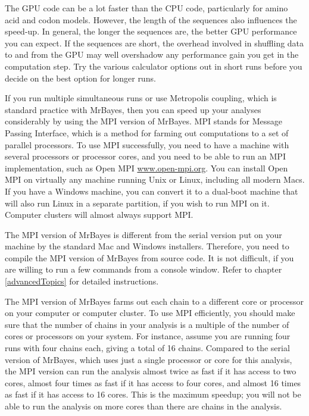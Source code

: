 \documentclass[12pt]{book}
\begin{document}
The GPU code can be a lot faster than the CPU code, particularly for amino acid and codon models.
However, the length of the sequences also influences the speed-up. In general, the longer
the sequences are, the better GPU performance you can expect. If the sequences
are short, the overhead involved in shuffling data to and from the GPU may well overshadow any performance
gain you get in the computation step. Try the various calculator options out in short runs before you decide on
the best option for longer runs.

If you run multiple simultaneous runs or use Metropolis coupling, which is standard practice with MrBayes,
then you can speed up your analyses considerably by using the MPI version of MrBayes. MPI stands for
Message Passing Interface, which is a method for farming out computations to a set of parallel processors.
To use MPI successfully, you need to have a machine with several processors or processor cores, and you
need to be able to run an MPI implementation, such as Open MPI \url{www.open-mpi.org}. You can install
Open MPI on virtually any machine running Unix or Linux, including all modern Macs. If you have a Windows
machine, you can convert it to a dual-boot machine that will also run Linux in a separate partition, if you wish
to run MPI on it. Computer clusters will almost always support MPI.

The MPI version of MrBayes is different from the serial version put on your machine by the standard Mac and
Windows installers. Therefore, you need to compile the MPI version of MrBayes from source code. It is not difficult,
if you are willing to run a few commands from a console window. Refer to chapter \ref{advancedTopics} for
detailed instructions.

The MPI version of MrBayes farms out each chain to a different core or processor on your computer or
computer cluster. To use MPI efficiently, you should make sure that the number of chains in your analysis
is a multiple of the number of cores or processors on your system. For instance, assume you are running four
runs with four chains each, giving a total of 16 chains. Compared to the serial version of MrBayes, which uses
just a single processor or core for this analysis, the MPI version can run the analysis almost twice as fast if
it has access to two cores, almost four times as fast if it has access to four cores, and almost 16 times as
fast if it has access to 16 cores. This is the maximum speedup; you will not be able to run the analysis
on more cores than there are chains in the analysis.
\end{document}

